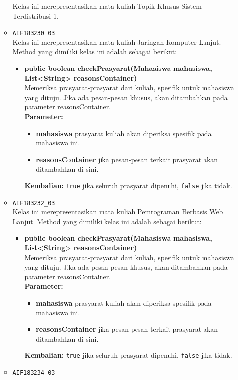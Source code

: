 \begin{enumerate}
\begin{itemize}
		Kelas ini merepresentasikan mata kuliah Topik Khusus Sistem Terdistribusi 1.
		\item \texttt{AIF183230\_03} \\
		Kelas ini merepresentasikan mata kuliah Jaringan Komputer Lanjut. Method yang dimiliki kelas ini adalah sebagai berikut: 
		\begin{itemize}
			\item \textbf{public boolean checkPrasyarat(Mahasiswa mahasiswa, List<String> reasonsContainer)}\\
			Memeriksa prasyarat-prasyarat dari kuliah, spesifik untuk mahasiswa yang dituju. Jika ada pesan-pesan khusus, akan ditambahkan pada parameter reasonsContainer.\\
			\textbf{Parameter:}
			\begin{itemize}
				\item \textbf{mahasiswa} prasyarat kuliah akan diperiksa spesifik pada mahasiswa ini.
				\item \textbf{reasonsContainer} jika pesan-pesan terkait prasyarat akan ditambahkan di sini.
			\end{itemize}
			\textbf{Kembalian:} \texttt{true} jika seluruh prasyarat dipenuhi, \texttt{false} jika tidak.
		\end{itemize}
		\item \texttt{AIF183232\_03} \\
		Kelas ini merepresentasikan mata kuliah Pemrograman Berbasis Web Lanjut. Method yang dimiliki kelas ini adalah sebagai berikut: 
		\begin{itemize}
			\item \textbf{public boolean checkPrasyarat(Mahasiswa mahasiswa, List<String> reasonsContainer)}\\
			Memeriksa prasyarat-prasyarat dari kuliah, spesifik untuk mahasiswa yang dituju. Jika ada pesan-pesan khusus, akan ditambahkan pada parameter reasonsContainer.\\
			\textbf{Parameter:}
			\begin{itemize}
				\item \textbf{mahasiswa} prasyarat kuliah akan diperiksa spesifik pada mahasiswa ini.
				\item \textbf{reasonsContainer} jika pesan-pesan terkait prasyarat akan ditambahkan di sini.
			\end{itemize}
			\textbf{Kembalian:} \texttt{true} jika seluruh prasyarat dipenuhi, \texttt{false} jika tidak.
		\end{itemize}
		\item \texttt{AIF183234\_03} \\

\end{itemize}
\end{enumerate}

